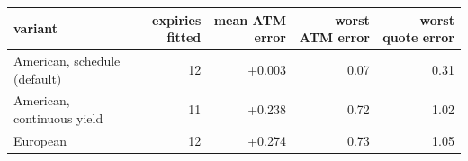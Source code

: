 \begin{center}\footnotesize
\begin{tabular}{|l|r|r|r|r|}
\hline
variant & expiries fitted & mean ATM error & worst ATM error & worst quote error \\ \hline
American, schedule (default) & 12 & +0.003 & 0.07 & 0.31 \\
American, continuous yield & 11 & +0.238 & 0.72 & 1.02 \\
European & 12 & +0.274 & 0.73 & 1.05 \\
\hline
\end{tabular}
\end{center}
